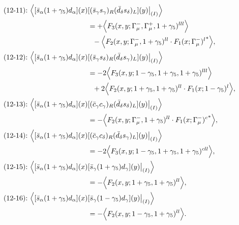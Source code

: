 \begin{align}
\mbox{(12-11):}\ 
\Big\langle
[\bar s_\alpha (1 + \gamma_5) d_\alpha](x)&
[(\bar s_\gamma s_\gamma)_R(\bar d_\delta s_\delta)_L](y)\big|_{(I)}
\Big\rangle
\notag\\*
&=
 + \Big\langle F_3(x,y;\Gamma_\mu^-,\Gamma_\mu^+,1+\gamma_5)^{lll}\Big\rangle
\notag\\*&\ \ 
 - \Big\langle F_2(x,y;\Gamma_\mu^-,1+\gamma_5)^{ll} \cdot {F_1(x;\Gamma_\mu^-)^l}^*\Big\rangle,
\\
\mbox{(12-12):}\ 
\Big\langle
[\bar s_\alpha (1 + \gamma_5) d_\alpha](x)&
[(\bar s_\gamma s_\delta)_R(\bar d_\delta s_\gamma)_L](y)\big|_{(I)}
\Big\rangle
\notag\\*
&=
-2\Big\langle F_3(x,y;1-\gamma_5,1+\gamma_5,1+\gamma_5)^{lll}\Big\rangle
\notag\\*&\ \ 
 + 2\Big\langle F_2(x,y;1+\gamma_5,1+\gamma_5)^{ll} \cdot F_1(x;1-\gamma_5)^l\Big\rangle,
\\
\mbox{(12-13):}\ 
\Big\langle
[\bar s_\alpha (1 + \gamma_5) d_\alpha](x)&
[(\bar c_\gamma c_\gamma)_R(\bar d_\delta s_\delta)_L](y)\big|_{(I)}
\Big\rangle
\notag\\*
&=
 - \Big\langle F_2(x,y;\Gamma_\mu^-,1+\gamma_5)^{ll} \cdot {F_1(x;\Gamma_\mu^-)^c}^*\Big\rangle,
\\
\mbox{(12-14):}\ 
\Big\langle
[\bar s_\alpha (1 + \gamma_5) d_\alpha](x)&
[(\bar c_\gamma c_\delta)_R(\bar d_\delta s_\gamma)_L](y)\big|_{(I)}
\Big\rangle
\notag\\*
&=
-2\Big\langle F_3(x,y;1-\gamma_5,1+\gamma_5,1+\gamma_5)^{cll}\Big\rangle,
\\
\mbox{(12-15):}\ 
\Big\langle
[\bar s_\alpha (1 + \gamma_5) d_\alpha](x)&
[\bar s_\gamma (1 + \gamma_5) d_\gamma](y)\big|_{(I)}
\Big\rangle
\notag\\*
&=
 - \Big\langle F_2(x,y;1+\gamma_5,1+\gamma_5)^{ll}\Big\rangle,
\\
\mbox{(12-16):}\ 
\Big\langle
[\bar s_\alpha (1 + \gamma_5) d_\alpha](x)&
[\bar s_\gamma (1 - \gamma_5) d_\gamma](y)\big|_{(I)}
\Big\rangle
\notag\\*
&=
 - \Big\langle F_2(x,y;1-\gamma_5,1+\gamma_5)^{ll}\Big\rangle.
\end{align}


